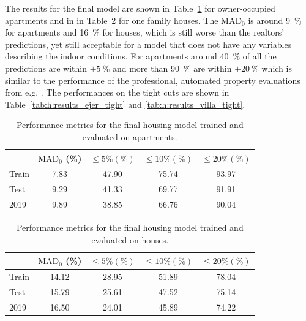 The results for the final model are shown in Table~\ref{tab:h:results_ejer} for owner-occupied apartments and in in Table~\ref{tab:h:results_villa} for one family houses. The $\mathrm{MAD}_0$ is around \SI{9}{\percent} for apartments and \SI{16}{\percent} for houses, which is still worse than the realtors' predictions, yet still acceptable for a model that does not have any variables describing the indoor conditions. For apartments around \SI{40}{\percent} of all the predictions are within $\pm \SI{5}{\percent}$ and more than \SI{90}{\percent} are within $\pm \SI{20}{\percent}$ which is similar to the performance of the professional, automated property evaluations from e.g. \citet{bolighedBolighedUsikkerhedDatavurderingen}. The performances on the tight cuts are shown in Table~\ref{tab:h:results_ejer_tight} and \ref{tab:h:results_villa_tight}. 

\begin{table}
  \centerfloat
  \begin{tabular}{@{}lcccc@{}}
    {} &      $\mathrm{MAD}_0$ (\%) & $\leq 5\% (\%)$ &  $\leq 10\% (\%)$ &   $\leq 20\% (\%)$   \\
    \midrule
    Train & \num{7.83} & \num{47.90} & \num{75.74} & \num{93.97} \\
    Test  & \num{9.29} & \num{41.33} & \num{69.77} & \num{91.91} \\
    2019  & \num{9.89} & \num{38.85} & \num{66.76} & \num{90.04}    
  \end{tabular}
  \caption[Performance Metrics for Apartments]{Performance metrics for the final housing model trained and evaluated on apartments.}
  \label{tab:h:results_ejer}
\end{table}


\begin{table}
  \centerfloat
  \begin{tabular}{@{}lcccc@{}}
    {} &      $\mathrm{MAD}_0$ (\%) & $\leq 5\% (\%)$ &  $\leq 10\% (\%)$ &   $\leq 20\% (\%)$    \\
    \midrule
    Train & \num{14.12} & \num{28.95} & \num{51.89} & \num{78.04}  \\
    Test  & \num{15.79} & \num{25.61} & \num{47.52} & \num{75.14}  \\
    2019  & \num{16.50} & \num{24.01} & \num{45.89} & \num{74.22}     
  \end{tabular}
  \caption[Performance Metrics for Houses]{Performance metrics for the final housing model trained and evaluated on houses.}
  \label{tab:h:results_villa}
\end{table}



